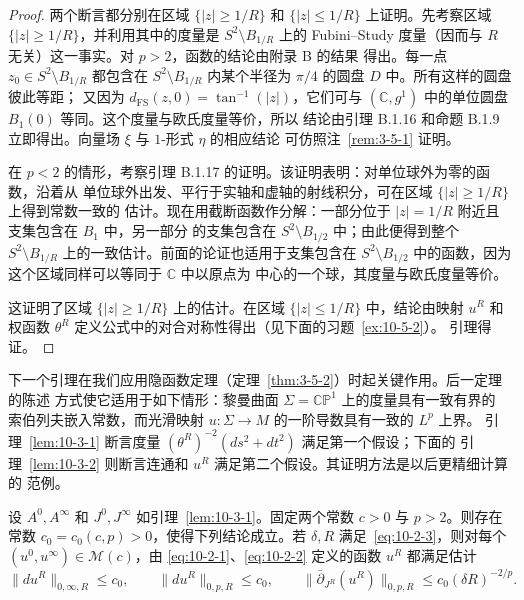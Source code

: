 \begin{proof}
两个断言都分别在区域 $\{|z|\ge1/R\}$ 和 $\{|z|\le1/R\}$ 上证明。先考察区域
$\{|z|\ge1/R\}$，并利用其中的度量是 $S^2\setminus B_{1/R}$ 上的
Fubini--Study 度量（因而与 $R$ 无关）这一事实。对 $p>2$，函数的结论由附录 B 的结果
得出。每一点 $z_0\in S^2\setminus B_{1/R}$ 都包含在
$S^2\setminus B_{1/R}$ 内某个半径为 $\pi/4$ 的圆盘 $D$ 中。所有这样的圆盘彼此等距；
又因为 $d_{\mathrm{FS}}(z,0)=\tan^{-1}(|z|)$，它们可与
$(\mathbb C,g^1)$ 中的单位圆盘 $B_1(0)$ 等同。这个度量与欧氏度量等价，所以
结论由引理 B.1.16 和命题 B.1.9 立即得出。向量场 $\xi$ 与 $1$-形式 $\eta$ 的相应结论
可仿照注~\ref{rem:3-5-1} 证明。

在 $p<2$ 的情形，考察引理 B.1.17 的证明。该证明表明：对单位球外为零的函数，沿着从
单位球外出发、平行于实轴和虚轴的射线积分，可在区域 $\{|z|\ge1/R\}$ 上得到常数一致的
估计。现在用截断函数作分解：一部分位于 $|z|=1/R$ 附近且支集包含在 $B_1$ 中，另一部分
的支集包含在 $S^2\setminus B_{1/2}$ 中；由此便得到整个
$S^2\setminus B_{1/R}$ 上的一致估计。前面的论证也适用于支集包含在
$S^2\setminus B_{1/2}$ 中的函数，因为这个区域同样可以等同于 $\mathbb C$ 中以原点为
中心的一个球，其度量与欧氏度量等价。

这证明了区域 $\{|z|\ge1/R\}$ 上的估计。在区域 $\{|z|\le1/R\}$ 中，结论由映射
$u^R$ 和权函数 $\theta^R$ 定义公式中的对合对称性得出（见下面的习题~\ref{ex:10-5-2}）。
引理得证。
\end{proof}

下一个引理在我们应用隐函数定理（定理~\ref{thm:3-5-2}）时起关键作用。后一定理的陈述
方式使它适用于如下情形：黎曼曲面 $\Sigma=\mathbb{CP}^1$ 上的度量具有一致有界的
索伯列夫嵌入常数，而光滑映射 $u:\Sigma\to M$ 的一阶导数具有一致的 $L^p$ 上界。
引理~\ref{lem:10-3-1} 断言度量 $(\theta^R)^{-2}(ds^2+dt^2)$ 满足第一个假设；下面的
引理~\ref{lem:10-3-2} 则断言连通和 $u^R$ 满足第二个假设。其证明方法是以后更精细计算的
范例。

\begin{lemma}\label{lem:10-3-2}
设 $A^0,A^\infty$ 和 $J^0,J^\infty$ 如引理~\ref{lem:10-3-1}。固定两个常数
$c>0$ 与 $p>2$。则存在常数 $c_0=c_0(c,p)>0$，使得下列结论成立。若 $\delta,R$
满足~\eqref{eq:10-2-3}，则对每个 $(u^0,u^\infty)\in\mathcal M(c)$，由
\eqref{eq:10-2-1}、\eqref{eq:10-2-2} 定义的函数 $u^R$ 都满足估计
\[
  \|du^R\|_{0,\infty,R}\le c_0,
  \qquad
  \|du^R\|_{0,p,R}\le c_0,
  \qquad
  \|\bar\partial_{J^R}(u^R)\|_{0,p,R}
  \le c_0(\delta R)^{-2/p}.
\]
\end{lemma}

